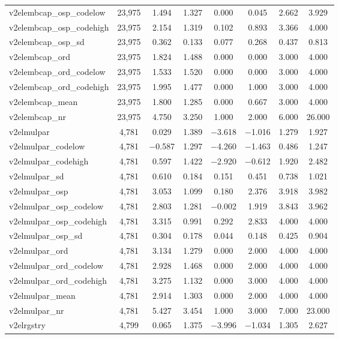 \begin{table}[!htbp]
\begin{tabular}{@{\extracolsep{5pt}}lccccccc}
v2elembcap\_osp\_codelow & 23,975 & 1.494 & 1.327 & 0.000 & 0.045 & 2.662 & 3.929 \\ 
v2elembcap\_osp\_codehigh & 23,975 & 2.154 & 1.319 & 0.102 & 0.893 & 3.366 & 4.000 \\ 
v2elembcap\_osp\_sd & 23,975 & 0.362 & 0.133 & 0.077 & 0.268 & 0.437 & 0.813 \\ 
v2elembcap\_ord & 23,975 & 1.824 & 1.488 & 0.000 & 0.000 & 3.000 & 4.000 \\ 
v2elembcap\_ord\_codelow & 23,975 & 1.533 & 1.520 & 0.000 & 0.000 & 3.000 & 4.000 \\ 
v2elembcap\_ord\_codehigh & 23,975 & 1.995 & 1.477 & 0.000 & 1.000 & 3.000 & 4.000 \\ 
v2elembcap\_mean & 23,975 & 1.800 & 1.285 & 0.000 & 0.667 & 3.000 & 4.000 \\ 
v2elembcap\_nr & 23,975 & 4.750 & 3.250 & 1.000 & 2.000 & 6.000 & 26.000 \\ 
v2elmulpar & 4,781 & 0.029 & 1.389 & $-$3.618 & $-$1.016 & 1.279 & 1.927 \\ 
v2elmulpar\_codelow & 4,781 & $-$0.587 & 1.297 & $-$4.260 & $-$1.463 & 0.486 & 1.247 \\ 
v2elmulpar\_codehigh & 4,781 & 0.597 & 1.422 & $-$2.920 & $-$0.612 & 1.920 & 2.482 \\ 
v2elmulpar\_sd & 4,781 & 0.610 & 0.184 & 0.151 & 0.451 & 0.738 & 1.021 \\ 
v2elmulpar\_osp & 4,781 & 3.053 & 1.099 & 0.180 & 2.376 & 3.918 & 3.982 \\ 
v2elmulpar\_osp\_codelow & 4,781 & 2.803 & 1.281 & $-$0.002 & 1.919 & 3.843 & 3.962 \\ 
v2elmulpar\_osp\_codehigh & 4,781 & 3.315 & 0.991 & 0.292 & 2.833 & 4.000 & 4.000 \\ 
v2elmulpar\_osp\_sd & 4,781 & 0.304 & 0.178 & 0.044 & 0.148 & 0.425 & 0.904 \\ 
v2elmulpar\_ord & 4,781 & 3.134 & 1.279 & 0.000 & 2.000 & 4.000 & 4.000 \\ 
v2elmulpar\_ord\_codelow & 4,781 & 2.928 & 1.468 & 0.000 & 2.000 & 4.000 & 4.000 \\ 
v2elmulpar\_ord\_codehigh & 4,781 & 3.275 & 1.132 & 0.000 & 3.000 & 4.000 & 4.000 \\ 
v2elmulpar\_mean & 4,781 & 2.914 & 1.303 & 0.000 & 2.000 & 4.000 & 4.000 \\ 
v2elmulpar\_nr & 4,781 & 5.427 & 3.454 & 1.000 & 3.000 & 7.000 & 23.000 \\ 
v2elrgstry & 4,799 & 0.065 & 1.375 & $-$3.996 & $-$1.034 & 1.305 & 2.627 \\ 

\end{tabular}
\end{table}
